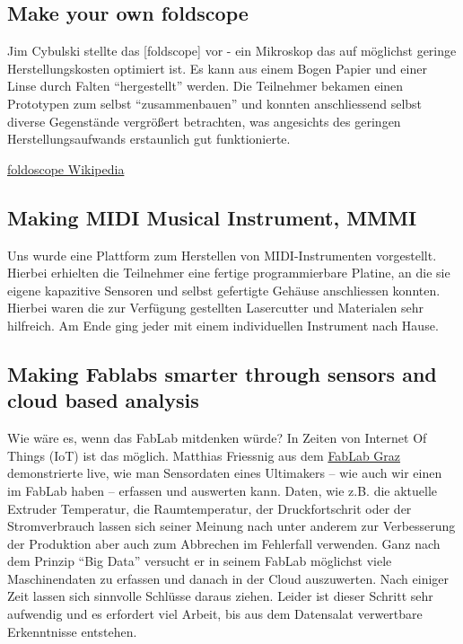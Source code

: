 \documentclass{\basedir/fablab-document}
\begin{document}
\subsection*{Make your own foldscope}

Jim Cybulski stellte das {[}foldscope{]} vor - ein Mikroskop das auf
möglichst geringe Herstellungskosten optimiert ist. Es kann aus einem
Bogen Papier und einer Linse durch Falten ``hergestellt'' werden. Die
Teilnehmer bekamen einen Prototypen zum selbst ``zusammenbauen'' und
konnten anschliessend selbst diverse Gegenstände vergrößert betrachten,
was angesichts des geringen Herstellungsaufwands erstaunlich gut
funktionierte.

\href{https://en.wikipedia.org/wiki/Foldscope}{foldoscope Wikipedia}

\subsection*{Making MIDI Musical Instrument, MMMI}

Uns wurde eine Plattform zum Herstellen von MIDI-Instrumenten
vorgestellt. Hierbei erhielten die Teilnehmer eine fertige
programmierbare Platine, an die sie eigene kapazitive Sensoren und
selbst gefertigte Gehäuse anschliessen konnten. Hierbei waren die zur
Verfügung gestellten Lasercutter und Materialen sehr hilfreich. Am Ende
ging jeder mit einem individuellen Instrument nach Hause.

\subsection*{Making Fablabs smarter through sensors and cloud based analysis}

Wie wäre es, wenn das FabLab mitdenken würde? In Zeiten von Internet Of
Things (IoT) ist das möglich. Matthias Friessnig aus dem
\href{http://fablab.tugraz.at/}{FabLab Graz} demonstrierte live, wie man
Sensordaten eines Ultimakers -- wie auch wir einen im FabLab haben --
erfassen und auswerten kann. Daten, wie z.B. die aktuelle Extruder
Temperatur, die Raumtemperatur, der Druckfortschrit oder der
Stromverbrauch lassen sich seiner Meinung nach unter anderem zur
Verbesserung der Produktion aber auch zum Abbrechen im Fehlerfall
verwenden. Ganz nach dem Prinzip ``Big Data'' versucht er in seinem
FabLab möglichst viele Maschinendaten zu erfassen und danach in der
Cloud auszuwerten. Nach einiger Zeit lassen sich sinnvolle Schlüsse
daraus ziehen. Leider ist dieser Schritt sehr aufwendig und es erfordert
viel Arbeit, bis aus dem Datensalat verwertbare Erkenntnisse entstehen.
\end{document}
